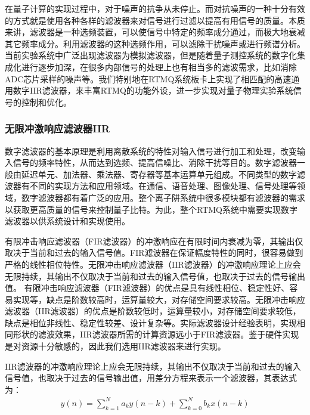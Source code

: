 在量子计算的实现过程中，对于噪声的抗争从未停止。而对抗噪声的一种十分有效的方式就是使用各种各样的滤波器来对信号进行过滤以提高有用信号的质量。本质来讲，滤波器是一种选频装置，可以使信号中特定的频率成分通过，而极大地衰减其它频率成分。利用滤波器的这种选频作用，可以滤除干扰噪声或进行频谱分析。
当前实验系统中广泛出现滤波器为模拟滤波器，但是随着量子测控系统的数字化集成化进行逐步加深，在很多内部信号的处理上也有相当多的滤波需求，比如消除ADC芯片采样的噪声等。我们特别地在RTMQ系统板卡上实现了相匹配的高速通用数字IIR滤波器，来丰富RTMQ的功能外设，进一步实现对量子物理实验系统信号的控制和优化。


\subsubsection[无限冲激响应滤波器IIR]{无限冲激响应滤波器IIR}
数字滤波器的基本原理是利用离散系统的特性对输入信号进行加工和处理，改变输入信号的频率特性，从而达到选频、提高信噪比、消除干扰等目的。数字滤波器一般由延迟单元、加法器、乘法器、寄存器等基本运算单元组成。不同类型的数字滤波器有不同的实现方法和应用领域。在通信、语音处理、图像处理、信号处理等领域，数字滤波器都有着广泛的应用。整个离子阱系统中很多模块都有滤波器的需求以获取更高质量的信号来控制量子比特。为此，整个RTMQ系统中需要实现数字滤波器以供系统设计和实现使用。

有限冲击响应滤波器（FIR滤波器）的冲激响应在有限时间内衰减为零，其输出仅取决于当前和过去的输入信号值。FIR滤波器在保证幅度特性的同时，很容易做到严格的线性相位特性。无限冲击响应滤波器（IIR滤波器）的冲激响应理论上应会无限持续，其输出不仅取决于当前和过去的输入信号值，也取决于过去的信号输出值。
有限冲击响应滤波器（FIR滤波器）的优点是具有线性相位、稳定性好、容易实现等，缺点是阶数较高时，运算量较大，对存储空间要求较高。无限冲击响应滤波器（IIR滤波器）的优点是阶数较低时，运算量较小，对存储空间要求较低，缺点是相位非线性、稳定性较差、设计复杂等。实际滤波器设计经验表明，实现相同形状的滤波效果，IIR滤波器所需的计算资源远小于FIR滤波器。鉴于硬件实现是对资源十分敏感的，因此我们选用IIR滤波器来进行实现。

IIR滤波器的冲激响应理论上应会无限持续，其输出不仅取决于当前和过去的输入信号值，也取决于过去的信号输出值，用差分方程来表示一个滤波器，其表达式为：
\begin{align}
    y(n)=\sum_{k=1}^Na_ky(n-k)+\sum_{k=0}^Nb_kx(n-k)\label{eq:iir_filter}
\end{align}


